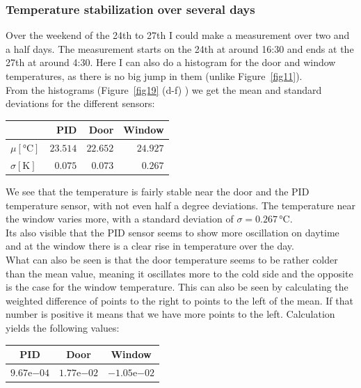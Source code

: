 \documentclass[12pt]{scrartcl}
\begin{document}
      \subsubsection{Temperature stabilization over several days}
      Over the weekend of the 24th to 27th I could make a measurement over two
      and a half days. The measurement starts on the 24th at around 16:30 and
      ends at the 27th at around 4:30. Here I can also do a histogram for the
      door and window temperatures, as there is no big jump in them (unlike
      Figure~\ref{fig11}).\\
      From the histograms (Figure~\ref{fig19} (d-f) ) we get the mean and
      standard deviations for the different sensors:
      \\
      \begin{table}[H]
        \begin{tabular}{l | r | r | r}
          & PID & Door & Window \\
          \hline
          $\mu[\text{°C}]$ & $23.514$ & $22.652$ & $24.927$ \\
          $\sigma[\text{K}]$ & $0.075$ & $0.073$ & $0.267$
        \end{tabular}
      \end{table}
      We see that the temperature is fairly stable near the door and the PID
      temperature sensor, with
      not even half a degree deviations. The temperature near the window varies
      more, with a standard deviation of $\sigma = 0.267\,\text{°C}$.\\
      Its also visible that the PID sensor seems to show more oscillation on
      daytime and at the window there is a clear rise in temperature over the day.
      \\What can also be seen is that the door temperature seems to be rather
      colder than the mean value, meaning it oscillates more to the cold side
      and the opposite is the case for the window temperature. This can also be
      seen by calculating the weighted difference of points to the right to
      points to the left of the mean. If that number is positive it means that
      we have more points to the left.
      Calculation yields the following values: \vspace{-5pt}
      \begin{table}[H]
        \begin{tabular}{c | c | c}
          PID & Door & Window \\
          \hline
          $9.67\mathrm{e}{-04}$ & $1.77\mathrm{e}{-02}$ & $-1.05\mathrm{e}{-02}$
        \end{tabular}
      \end{table}
\end{document}
